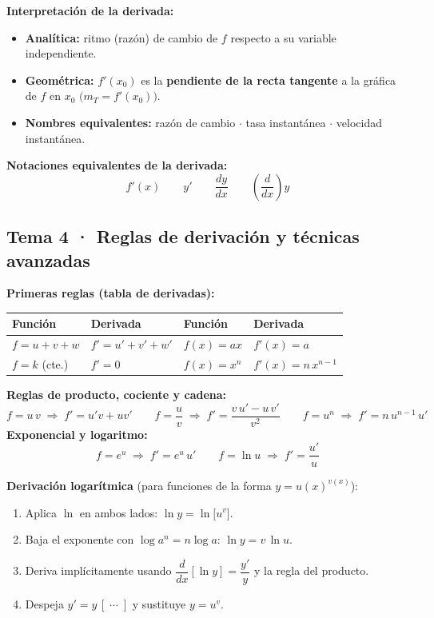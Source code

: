 \documentclass[12pt, letterpaper]{article}
\begin{document}
\begin{cuadroteoria}
  \textbf{Interpretación de la derivada:}
  \begin{itemize}
    \item \textbf{Analítica:} ritmo (razón) de cambio de $f$ respecto a su variable independiente.
    \item \textbf{Geométrica:} $f'(x_0)$ es la \textbf{pendiente de la recta tangente} a la gráfica de $f$ en $x_0$ $\bigl(m_T = f'(x_0)\bigr)$.
    \item \textbf{Nombres equivalentes:} razón de cambio $\cdot$ tasa instantánea $\cdot$ velocidad instantánea.
  \end{itemize}
  \textbf{Notaciones equivalentes de la derivada:}
  \[
    f'(x) \qquad y' \qquad \frac{dy}{dx} \qquad \left(\frac{d}{dx}\right)y
  \]
\end{cuadroteoria}

\subsection{Tema 4 · Reglas de derivación y técnicas avanzadas}

\begin{cuadroteoria}
  \textbf{Primeras reglas (tabla de derivadas):}
  \begin{center}
  \begin{tabular}{@{}ll@{\qquad}ll@{}}
    \toprule
    \textbf{Función} & \textbf{Derivada} & \textbf{Función} & \textbf{Derivada} \\
    \midrule
    $f = u + v + w$ & $f' = u' + v' + w'$ & $f(x) = ax$ & $f'(x) = a$ \\
    $f = k$ (cte.) & $f' = 0$ & $f(x) = x^{n}$ & $f'(x) = n\,x^{n-1}$ \\
    \bottomrule
  \end{tabular}
  \end{center}
  \textbf{Reglas de producto, cociente y cadena:}
  \[
    f = u\,v \;\Rightarrow\; f' = u'v + uv'
    \qquad
    f = \frac{u}{v} \;\Rightarrow\; f' = \frac{v\,u' - u\,v'}{v^{2}}
    \qquad
    f = u^{n} \;\Rightarrow\; f' = n\,u^{n-1}\,u'
  \]
  \textbf{Exponencial y logaritmo:}
  \[
    f = e^{u} \;\Rightarrow\; f' = e^{u}\,u'
    \qquad
    f = \ln u \;\Rightarrow\; f' = \frac{u'}{u}
  \]
\end{cuadroteoria}

\begin{cuadropasos}
  \textbf{Derivación logarítmica} (para funciones de la forma $y = u(x)^{v(x)}$):
  \begin{enumerate}
    \item Aplica $\ln$ en ambos lados: $\ln y = \ln\!\bigl[u^{v}\bigr]$.
    \item Baja el exponente con $\log a^{n} = n\log a$: $\ln y = v\,\ln u$.
    \item Deriva implícitamente usando $\dfrac{d}{dx}[\ln y] = \dfrac{y'}{y}$ y la regla del producto.
    \item Despeja $y' = y\,[\;\cdots\;]$ y sustituye $y = u^{v}$.
  \end{enumerate}
\end{cuadropasos}
\end{document}
